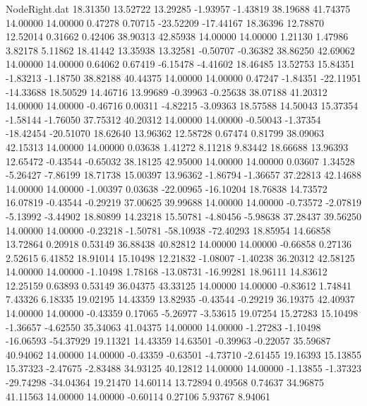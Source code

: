 \begin{filecontents}{NodeRight.dat}
  18.31350   13.52722   13.29285    -1.93957   -1.43819   38.19688   41.74375   14.00000   14.00000    0.47278    0.70715  -23.52209  -17.44167
  18.36396   12.78870   12.52014     0.31662    0.42406   38.90313   42.85938   14.00000   14.00000    1.21130    1.47986    3.82178    5.11862
  18.41442   13.35938   13.32581    -0.50707   -0.36382   38.86250   42.69062   14.00000   14.00000    0.64062    0.67419   -6.15478   -4.41602
  18.46485   13.52753   15.84351    -1.83213   -1.18750   38.82188   40.44375   14.00000   14.00000    0.47247   -1.84351  -22.11951  -14.33688
  18.50529   14.46716   13.99689    -0.39963   -0.25638   38.07188   41.20312   14.00000   14.00000   -0.46716    0.00311   -4.82215   -3.09363
  18.57588   14.50043   15.37354    -1.58144   -1.76050   37.75312   40.20312   14.00000   14.00000   -0.50043   -1.37354  -18.42454  -20.51070
  18.62640   13.96362   12.58728     0.67474    0.81799   38.09063   42.15313   14.00000   14.00000    0.03638    1.41272    8.11218    9.83442
  18.66688   13.96393   12.65472    -0.43544   -0.65032   38.18125   42.95000   14.00000   14.00000    0.03607    1.34528   -5.26427   -7.86199
  18.71738   15.00397   13.96362    -1.86794   -1.36657   37.22813   42.14688   14.00000   14.00000   -1.00397    0.03638  -22.00965  -16.10204
  18.76838   14.73572   16.07819    -0.43544   -0.29219   37.00625   39.99688   14.00000   14.00000   -0.73572   -2.07819   -5.13992   -3.44902
  18.80899   14.23218   15.50781    -4.80456   -5.98638   37.28437   39.56250   14.00000   14.00000   -0.23218   -1.50781  -58.10938  -72.40293
  18.85954   14.66858   13.72864     0.20918    0.53149   36.88438   40.82812   14.00000   14.00000   -0.66858    0.27136    2.52615    6.41852
  18.91014   15.10498   12.21832    -1.08007   -1.40238   36.20312   42.58125   14.00000   14.00000   -1.10498    1.78168  -13.08731  -16.99281
  18.96111   14.83612   12.25159     0.63893    0.53149   36.04375   43.33125   14.00000   14.00000   -0.83612    1.74841    7.43326    6.18335
  19.02195   14.43359   13.82935    -0.43544   -0.29219   36.19375   42.40937   14.00000   14.00000   -0.43359    0.17065   -5.26977   -3.53615
  19.07254   15.27283   15.10498    -1.36657   -4.62550   35.34063   41.04375   14.00000   14.00000   -1.27283   -1.10498  -16.06593  -54.37929
  19.11321   14.43359   14.63501    -0.39963   -0.22057   35.59687   40.94062   14.00000   14.00000   -0.43359   -0.63501   -4.73710   -2.61455
  19.16393   15.13855   15.37323    -2.47675   -2.83488   34.93125   40.12812   14.00000   14.00000   -1.13855   -1.37323  -29.74298  -34.04364
  19.21470   14.60114   13.72894     0.49568    0.74637   34.96875   41.11563   14.00000   14.00000   -0.60114    0.27106    5.93767    8.94061

\end{filecontents}
